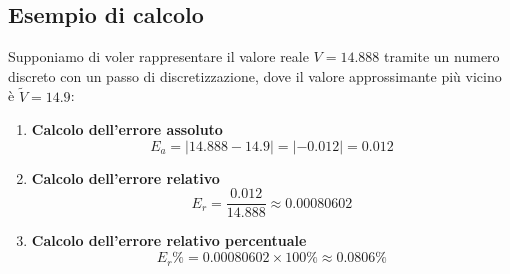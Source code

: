 \subsection{Esempio di calcolo}
Supponiamo di voler rappresentare il valore reale $V = 14.888$ tramite un numero discreto con un passo di discretizzazione, dove il valore approssimante più vicino è $\tilde{V} = 14.9$:

\begin{enumerate}
    \item \textbf{Calcolo dell'errore assoluto}
    $$
        E_a = |14.888 - 14.9| = |-0.012| = 0.012
    $$
    \item \textbf{Calcolo dell'errore relativo}
    $$
        E_r = \frac{0.012}{14.888} \approx 0.00080602
    $$
    \item \textbf{Calcolo dell'errore relativo percentuale}
    $$E_r\% = 0.00080602 \times 100\% \approx 0.0806\%$$
\end{enumerate}